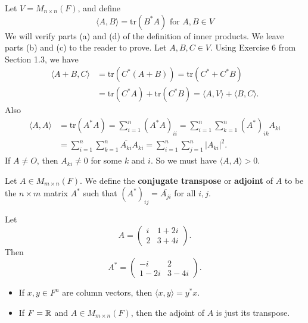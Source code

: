 \begin{eg}\label{Frobenius Inner Product}
    Let \( V = {M}_{n \times n}(F) \), and define 
    \[ \langle A,B  \rangle = \text{tr}(B^{*} A) \text{ for }  A,B \in V  \]
    We will verify parts (a) and (d) of the definition of inner products. We leave parts (b) and (c) to the reader to prove. Let \( A, B, C \in V  \). Using Exercise 6 from Section 1.3, we have
    \begin{align*}
        \langle A + B , C  \rangle &= \text{tr}(C^{*}(A+B)) = \text{tr}(C^{*} + C^{*}B) \\
                                   &= \text{tr}(C^{*}A) + \text{tr}(C^{*} B) = \langle A,V  \rangle + \langle  B, C  \rangle.
    \end{align*}
    Also
    \begin{align*}
        \langle A, A  \rangle &= \text{tr}(A^{*} A ) = \sum_{ i=1 }^{ n } (A^{*} A)_{ii} = \sum_{ i=1 }^{ n } \sum_{ k=1 }^{ n } {(A^{*})}_{ik} {A}_{ki} \\
                              &= \sum_{ i=1 }^{ n } \sum_{ k=1 }^{ n } \overline{{A}_{ki}} {A}_{ki} = \sum_{ i=1 }^{ n } \sum_{ j=1 }^{ n } | {A}_{ki} | ^{2}.
    \end{align*}
    If \( A \neq O  \), then \( {A}_{ki} \neq  0  \) for some \( k  \) and \( i  \). So we must have \( \langle A,A  \rangle > 0  \).
\end{eg}

\begin{definition}
    Let \( A \in {M}_{m \times n}(F) \). We define the \textbf{conjugate transpose} or \textbf{adjoint} of \( A  \) to be the \( n \times m  \) matrix \( A^*  \) such that \( {(A^*)}_{ij} = \overline{{A}_{ji}} \) for all \( i,j  \).
\end{definition}

\begin{eg}
    Let 
    \[  A = \begin{pmatrix} 
        i & 1 + 2i \\
        2 & 3 + 4i 
              \end{pmatrix}. \]
    Then
        \[  A^{*} = \begin{pmatrix} 
                   -i & 2 \\
                   1 - 2i & 3 - 4i 
                  \end{pmatrix}. \]
\end{eg}

\begin{itemize}
    \item If \( x,y \in F^{n} \) are column vectors, then \( \langle x,y \rangle = y^{*}x  \).
    \item If \( F = \mathbb{R}  \) and \( A \in {M}_{m \times n}(F) \), then the adjoint of \( A  \) is just its transpose.
\end{itemize}

